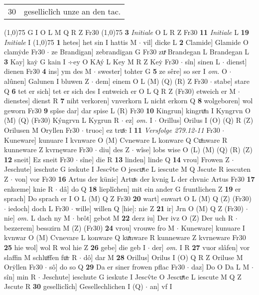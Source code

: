 \documentclass[8pt,a4paper,notitlepage]{article}
\begin{document}
\begin{table}[ht]
\begin{minipage}[t]{0.5\linewidth}
\begin{tabular}{rl}
30 & geselliclîch unze an den tac.\\ 
\end{tabular}
\scriptsize
\line(1,0){75} \newline
G I O L M Q R Z Fr30 \newline
\line(1,0){75} \newline
\textbf{3} \textit{Initiale} O L R Z Fr30  \textbf{11} \textit{Initiale} L  \textbf{19} \textit{Initiale} I  \newline
\line(1,0){75} \newline
\textbf{1} hetes] het sin I hattis M  $\cdot$ vil] dicke L \textbf{2} Clamide] Glamide O clamẏde Fr30  $\cdot$ ze Brandigan] zebrandigan G Fr30 zuͯ Brandegan L Brandegan L \textbf{3} Kay] kaẏ G kain I ÷ey O KAý L Key M R Z Keẏ Fr30  $\cdot$ sîn] sinen L  $\cdot$ dienst] dienen Fr30 \textbf{4} ins] ym des M  $\cdot$ swester] tohter G \textbf{5} ze sêre] so ser I \textit{om.} O  $\cdot$ alûnen] Galunen I bluwen Z  $\cdot$ dem] einem O L (M) (Q) (R) Z Fr30  $\cdot$ stabe] stare Q \textbf{6} tet er sich] tet er sich des I entweich er O L Q R Z (Fr30) etweich er M  $\cdot$ dienstes] dienst R \textbf{7} niht verkoren] vnverkorn L nicht erkorn Q \textbf{8} wolgeboren] wol geworn Fr30 \textbf{9} spîse dar] dar spise L (R) Fr30 \textbf{10} Kingrun] kingruͤn I Kyngrvn O (M) (Q) (Fr30) Kýngrvn L Kygrun R  $\cdot$ ez] \textit{om.} I  $\cdot$ Orillus] Orilus I (O) (Q) R (Z) Orilusen M Oryllen Fr30  $\cdot$ truoc] ez truͤc I \textbf{11} \textit{Versfolge 279.12-11} Fr30   $\cdot$ Kuneware] kunuare I kvnware O (M) Cvneware L konware Q Cuͦnware R kunneware Z kvrnęware Fr30  $\cdot$ diu] des Z  $\cdot$ wîse] lobs wise O (L) (M) (Q) (R) (Z) \textbf{12} sneit] Ez sneit Fr30  $\cdot$ sîne] die R \textbf{13} linden] linde Q \textbf{14} vrou] Frowen Z  $\cdot$ Jeschute] ieschute G ieskute I Jescv̂te O jescuͯte L iescute M Q Jscute R iescuten Z  $\cdot$ von] vor Fr30 \textbf{16} Artus der künic] Artuͯs der kvnig L der chvnic Artus Fr30 \textbf{17} enkœme] knie R  $\cdot$ dâ] do Q \textbf{18} lieplîchen] mit ein ander G fruntlichen Z \textbf{19} er sprach] Do sprach er I O L (M) Q Z Fr30 \textbf{20} wart] enwart O L (M) Q (Z) (Fr30)  $\cdot$ iedoch] doch L Fr30  $\cdot$ wille] willen Q [hie]: nie Z \textbf{21} ir] Jrn O (M) Q Z (Fr30)  $\cdot$ nie] \textit{om.} L dach ny M  $\cdot$ brôt] gebot M \textbf{22} derz iu] Der ivz O (Z) Der uch R  $\cdot$ bezzerem] besszirn M (Z) (Fr30) \textbf{24} vrou] vrouwe fro M  $\cdot$ Kuneware] kunuare I kvnwar O (M) Cvnevare L konware Q kuͯnware R kunneware Z kvrneware Fr30 \textbf{25} hie wol] wol R wol hie Z \textbf{26} gebe] die geb I  $\cdot$ der] \textit{om.} I R \textbf{27} vuor slâfen] vor slaffin M schluͦffen fuͦr R  $\cdot$ dô] dar M \textbf{28} Orillus] Orilus I (O) Q R Z Oriluse M Orẏllen Fr30  $\cdot$ sô] do so Q \textbf{29} Da er siner frowen pflac Fr30  $\cdot$ daz] Do O Da L M  $\cdot$ sîn] min R  $\cdot$ Jeschute] ieschute G ieskute I Jescv̂te O Jescuͯte L iescute M Q Z Jscute R \textbf{30} geselliclîch] Gesellechlichen I (Q)  $\cdot$ an] vf I \newline

\end{minipage}
\end{table}
\end{document}
